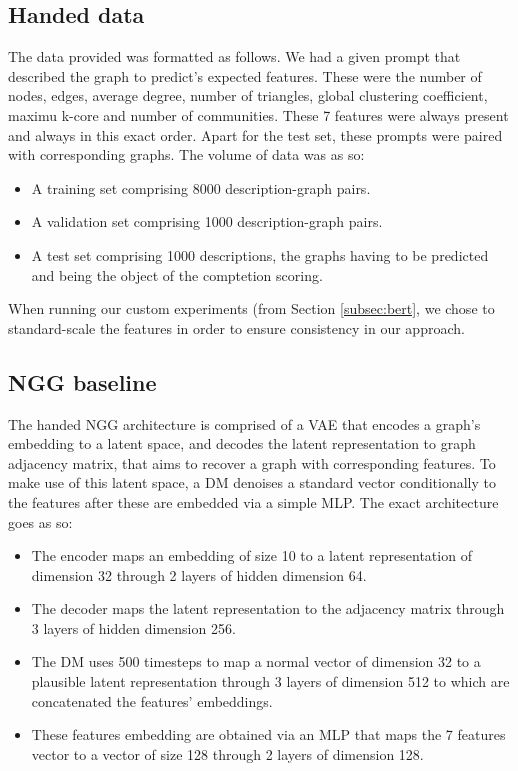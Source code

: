 \documentclass[10pt,twocolumn,letterpaper]{article}
\begin{document}
\subsection{Handed data}
\label{subsec:data}
The data provided was formatted as follows. We had a given prompt that described the graph to predict's expected features. These were the number of nodes, edges, average degree, number of triangles, global clustering coefficient, maximu k-core and number of communities. These 7 features were always present and always in this exact order. Apart for the test set, these prompts were paired with corresponding graphs. The volume of data was as so:
\begin{itemize}
    \item A training set comprising 8000 description-graph pairs.
    \item A validation set comprising 1000 description-graph pairs.
    \item A test set comprising 1000 descriptions, the graphs having to be predicted and being the object of the comptetion scoring.
\end{itemize}

When running our custom experiments (from Section \ref{subsec:bert}, we chose to standard-scale the features in order to ensure consistency in our approach.

\subsection{NGG baseline}
\label{subsec:NGG}
The handed NGG \cite{evdaimon2024neuralgraphgeneratorfeatureconditioned} architecture is comprised of a VAE that encodes a graph's embedding to a latent space, and decodes the latent representation to graph adjacency matrix, that aims to recover a graph with corresponding features. To make use of this latent space, a DM denoises a standard vector conditionally to the features after these are embedded via a simple MLP. The exact architecture goes as so:

\begin{itemize}
    \item The encoder maps an embedding of size 10 to a latent representation of dimension 32 through 2 layers of hidden dimension 64.
    \item The decoder maps the latent representation to the adjacency matrix through 3 layers of hidden dimension 256.
    \item The DM uses 500 timesteps to map a normal vector of dimension 32 to a plausible latent representation through 3 layers of dimension 512 to which are concatenated the features' embeddings.
    \item These features embedding are obtained via an MLP that maps the 7 features vector to a vector of size 128 through 2 layers of dimension 128.
\end{itemize}
\end{document}
